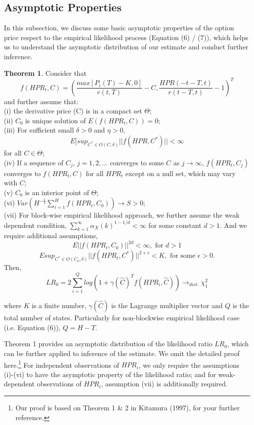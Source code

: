 \documentclass[oneside,english]{amsbook}
\numberwithin{section}{chapter}
\numberwithin{equation}{section}
\numberwithin{figure}{section}
\theoremstyle{plain}
\theoremstyle{plain}
\theoremstyle{definition}
\theoremstyle{plain}
\theoremstyle{plain}
\theoremstyle{remark}
\theoremstyle{definition}
\newtheorem{theorem}{Theorem}
\theoremstyle{definition}
\begin{document}
\subsection{Asymptotic Properties} 
In this subsection, we discuss some basic asymptotic properties of the option price respect to the empirical likelihood process (Equation (6) / (7)), which helps us to understand the asymptotic distribution of our estimate and conduct further inference.  
\begin{theorem}
Consider that
\[
f(HPR_t,C)=(\frac{max[P_i(T)-K,0]}{r(t,T)}-C, \frac{HPR(-t-T,t)}{r(t-T,t)}-1)^T
\]
and further assume that:\\
(i) the derivative price (C) is in a compact set $\Theta$; \\
(ii) $C_0$ is unique solution of $E(f(HPR_t,C))=0$;\\
(iii) For sufficient small $\delta>0$ and $\eta>0$, 
\[
E[sup_{C^*\in O(C,\delta)}||f(HPR,C^*)||<\infty 
\]
for all $C \in \Theta$;\\
(iv) If a sequence of $C_j$, $j=1,2,...$ converges to some $C$ as $j\rightarrow \infty$, $f(HPR_t,C_j)$ converges to $f(HPR_t,C)$ for all $HPR_t$ except on a null set, which may vary with $C$;\\
(v) $C_0$ is an interior point of $\Theta$;\\
(vi) $Var(H^{-\frac{1}{2}} \sum_{i=1}^H f(HPR_i,C_0))\rightarrow S >0$;\\
(vii) For block-wise empirical likelihood approach, we further assume the weak dependent condition, $\sum_{k=1}^\infty \alpha_X(k)^{1-1/d} <\infty$ for some constant $d>1$. And we require additional assumptions, 
\[
E||f(HPR_t,C_0)||^{2d}<\infty, \text{ for } d>1 
\]  
\[
E sup_{C^* \in O(C_0,\delta)} ||f(HPR_t,C^*)||^{2+\epsilon}<K, \text{ for some }\epsilon>0.
\]
Then, 
\[
LR_0=2\sum_{i=1}^Q log(1+\gamma(\hat{C})^T f(HPR_i,\hat{C})) \rightarrow_{dist.}  \chi _1^2
\]
\end{theorem}
where $K$ is a finite number, $\gamma(\hat{C})$ is the Lagrange multiplier vector and $Q$ is the total number of states. Particularly for non-blockwise empirical likelihood case (i.e. Equation (6)), $Q=H-T$.

Theorem 1 provides an asymptotic distribution of the likelihood ratio $LR_0$, which can be further applied to inference of the estimate. We omit the detailed proof here.\footnote{Our proof is based on Theorem 1 \& 2 in Kitamura (1997), for your further reference. } For independent observations of $HPR_i$, we only require the assumptions (i)-(vi) to have the asymptotic property of the likelihood ratio; and for weak-dependent observations of $HPR_i$, assumption (vii) is additionally required. 
\end{document}
